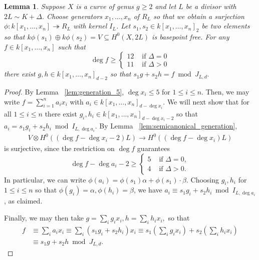 \documentclass{amsart}
\theoremstyle{plain}
\newtheorem{lem}[thm]{Lemma}
\theoremstyle{definition}
\theoremstyle{remark}
\numberwithin{equation}{section}
\begin{document}
\begin{lem}
\label{lem:reducing_degree}
Suppose $X$ is a curve of genus $g \geq 2$ and let $L$ be a divisor with $2L \sim K+\Delta$. Choose generators $x_1, \ldots, x_n$ of $R_L$ so that we obtain a surjection $\phi:k[x_1, \ldots, x_n] \twoheadrightarrow R_L$ with kernel $I_L$. Let $s_1,s_2 \in k[x_1, \ldots, x_n]_2$ be two elements so that $k\phi(s_1) \oplus k\phi(s_2) = V \subseteq H^0(X,2L)$ is basepoint free.
For any $f \in k[x_1, \ldots, x_n]$ such that
$$
\deg f \geq \begin{cases}
	12 &\text{ if }\Delta = 0\\
	11 &\text{ if }\Delta > 0
\end{cases}$$
there exist $g,h \in k[x_1, \ldots, x_n]_{d-2}$ so that $s_1g + s_2h = f \bmod J_{L,d}.$
\end{lem}
\begin{proof}
By Lemma ~\ref{lem:generation_5}, $\deg x_i \leq 5$ for $1 \leq i \leq n$. Then, we may write $f = \sum_{i = 1}^{n}a_i x_i$ with $a_i \in k[x_1, \ldots, x_n]_{d-\deg x_i}$.
We will next show that for all $1 \leq i \leq n$ there exist $g_i, h_i \in k[x_1, \ldots, x_n]_{d - \deg x_i - 2}$ so that $a_i = s_1g_i + s_2h_i \bmod I_{L,\deg a_i}.$ 
By Lemma ~\ref{lem:semicanonical_generation},
\begin{align*}
	V \otimes H^0((\deg f-\deg x_i -2)L) \rightarrow H^0((\deg f-\deg x_i)L)
\end{align*}
is surjective, since the restriction on $\deg f$ guarantees
$$
\deg f- \deg a_i -2 \geq \begin{cases}
	5 &\text{ if }\Delta = 0,\\
	4 &\text{ if }\Delta > 0.
\end{cases}$$
In particular, we can write $\phi(a_i) = \phi(s_1) \alpha + \phi(s_1) \cdot \beta$. Choosing $g_i,h_i$ for $1 \leq i \leq n$ so that $\phi(g_i) = \alpha,\phi(h_i) = \beta$, we have $a_i \equiv s_1 g_i + s_2 h_i \bmod I_{L,\deg a_i}$, as claimed.

Finally, we may then take $g = \sum_{i}^{}g_i x_i,h = \sum_{i}^{}h_i x_i,$ so that 
\begin{align*}
	f &\equiv \sum_{i}^{}a_i x_i \equiv \sum_{i}^{}(s_1g_i + s_2h_i)x_i \equiv s_1 \left( \sum_{i}^{}g_i x_i \right) + s_2 \left( \sum_{i}^{}h_i x_i \right) \\
	&\equiv s_1 g + s_2 h \bmod J_{L,d}.
\end{align*}
\end{proof}
\end{document}
